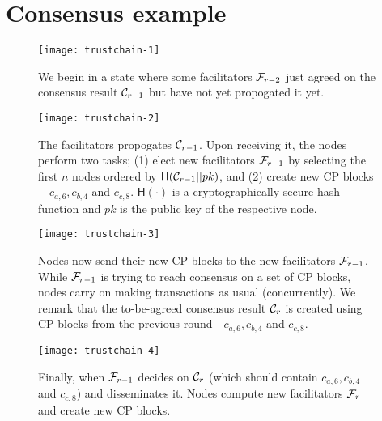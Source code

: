 \chapter{Consensus example}
\label{app:consensus-example}

\begin{figure}[htb]
    \texttt{[image: trustchain-1]}
    \centering
    \caption{We begin in a state where some facilitators $\mathcal{F}_{r-2}$ just agreed on the consensus result $\mathcal{C}_{r-1}$ but have not yet propogated it yet.}
    \label{fig:trustchain-1}
\end{figure}

\begin{figure}[htb]
    \texttt{[image: trustchain-2]}
    \centering
    \caption{The facilitators propogates $\mathcal{C}_{r-1}$. Upon receiving it, the nodes perform two tasks;
    (1) elect new facilitators $\mathcal{F}_{r-1}$ by selecting the first $n$ nodes ordered by $\textsf{H}(\mathcal{C}_{r-1} || pk)$,
    and (2) create new CP blocks---$c_{a, 6}, c_{b, 4}$ and $c_{c, 8}$.
    $\textsf{H}(\cdot)$ is a cryptographically secure hash function and $pk$ is the public key of the respective node.}
    \label{fig:trustchain-2}
\end{figure}

\begin{figure}
    \texttt{[image: trustchain-3]}
    \centering
    \caption{Nodes now send their new CP blocks to the new facilitators $\mathcal{F}_{r-1}$.
    While $\mathcal{F}_{r-1}$ is trying to reach consensus on a set of CP blocks,
    nodes carry on making transactions as usual (concurrently).
    We remark that the to-be-agreed consensus result $\mathcal{C}_r$ is created using CP blocks from the previous round---$c_{a, 6}, c_{b, 4}$ and $c_{c, 8}$.
    }
    \label{fig:trustchain-3}
\end{figure}

\begin{figure}
    \texttt{[image: trustchain-4]}
    \centering
    \caption{Finally, when $\mathcal{F}_{r-1}$ decides on $\mathcal{C}_r$ (which should contain $c_{a, 6}, c_{b, 4}$ and $c_{c, 8}$) and disseminates it.
    Nodes compute new facilitators $\mathcal{F}_{r}$ and create new CP blocks.}
    \label{fig:trustchain-4}
\end{figure}